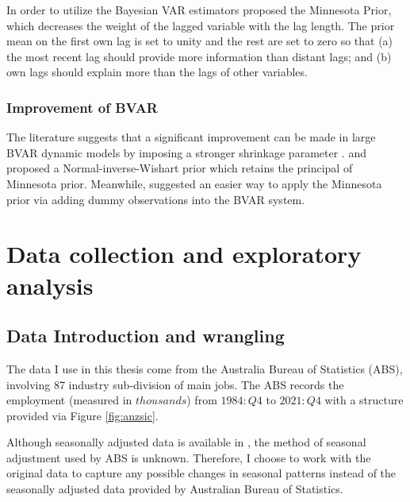 \documentclass{monashthesis}
\begin{document}
In order to utilize the Bayesian VAR estimators \textcite{litterman1979} proposed the Minnesota Prior, which decreases the weight of the lagged variable with the lag length. The prior mean on the first own lag is set to unity and the rest are set to zero so that (a) the most recent lag should provide more information than distant lags; and (b) own lags should explain more than the lags of other variables.

\hypertarget{improvement-of-bvar}{%
\subsection{Improvement of BVAR}\label{improvement-of-bvar}}

The literature suggests that a significant improvement can be made in large BVAR dynamic models by imposing a stronger shrinkage parameter \autocite{banbura2010large,litterman1986}. \textcite{robertson1999vector} and \textcite{kadiyala1997} proposed a Normal-inverse-Wishart prior which retains the principal of Minnesota prior. Meanwhile, \textcite{banbura2010large} suggested an easier way to apply the Minnesota prior via adding dummy observations into the BVAR system.

\clearpage

\hypertarget{data-collection-and-exploratory-analysis}{%
\chapter{Data collection and exploratory analysis}\label{data-collection-and-exploratory-analysis}}

\hypertarget{data-introduction-and-wrangling}{%
\section{Data Introduction and wrangling}\label{data-introduction-and-wrangling}}

The data I use in this thesis come from the Australia Bureau of Statistics (ABS), involving 87 industry sub-division of main jobs. The ABS records the employment (measured in \(thousands\)) from \(1984:Q4\) to \(2021:Q4\) with a structure provided via Figure \ref{fig:anzsic}.

Although seasonally adjusted data is available in \autocite{ABS2022}, the method of seasonal adjustment used by ABS is unknown. Therefore, I choose to work with the original data to capture any possible changes in seasonal patterns instead of the seasonally adjusted data provided by Australian Bureau of Statistics.
\end{document}
